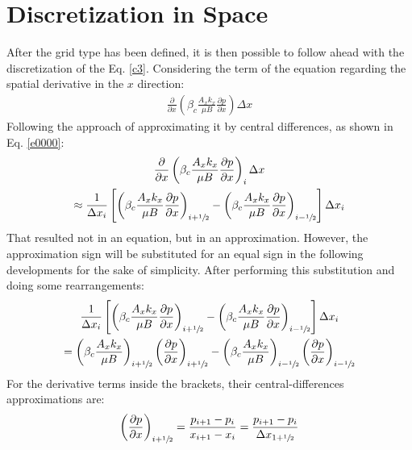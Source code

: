 \section{Discretization in Space}
After the grid type has been defined, it is then possible to follow ahead with the discretization of the Eq. \ref{c3}.	 %
 Considering the term of the equation regarding the spatial derivative in the $x$ direction:
	\begin{align}
	\label{e2.4}
	\frac{\partial}{\partial x}\left( \beta_c \frac{A_x k_x}{\mu B}\frac{\partial p}{\partial x}\right) \Delta x
	\end{align}
Following the \cite{Ertekin2001} approach of approximating it by central differences, as shown in Eq. \ref{e0000}:
	\begin{multline}
	\label{e2.5}
	\frac{\partial}{\partial x}\left( \beta_c \frac{A_x k_x}{\mu B}\frac{\partial p}{\partial x}\right)_i \Delta x \\ \approx \frac{1}{\Delta x_i} \left[ \left( \beta_c \frac{A_x k_x}{\mu B}\frac{\partial p}{\partial x}\right)_{i+\sfrac{1}{2}} - \left( \beta_c \frac{A_x k_x}{\mu B}\frac{\partial p}{\partial x}\right)_{i-\sfrac{1}{2}}\right] \Delta x_i
	\end{multline}
That resulted not in an equation, but in an approximation. However, the approximation sign will be substituted for an equal sign in the following developments for the sake of simplicity. After performing this substitution and doing some rearrangements:
	\begin{multline}
	\label{e2.6}
	\frac{1}{\Delta x_i} \left[ \left( \beta_c \frac{A_x k_x}{\mu B}\frac{\partial p}{\partial x}\right)_{i+\sfrac{1}{2}} - \left( \beta_c \frac{A_x k_x}{\mu B}\frac{\partial p}{\partial x}\right)_{i-\sfrac{1}{2}}\right] \Delta x_i \\= \left( \beta_c \frac{A_x k_x}{\mu B}\right)_{i+\sfrac{1}{2}} \left(\frac{\partial p}{\partial x}\right)_{i+\sfrac{1}{2}} - \left( \beta_c \frac{A_x k_x}{\mu B}\right)_{i-\sfrac{1}{2}} \left(\frac{\partial p}{\partial x}\right)_{i-\sfrac{1}{2}}
	\end{multline}
For the derivative terms inside the brackets, their central-differences approximations are:
	\begin{align}
	\label{e2.7}
	\left(\frac{\partial p}{\partial x}\right)_{i+\sfrac{1}{2}}= \frac{p_{i+1}-p_i}{x_{i+1}-x_i}=\frac{p_{i+1}-p_i}{\Delta x_{1+\sfrac{1}{2}}}
	\end{align}

